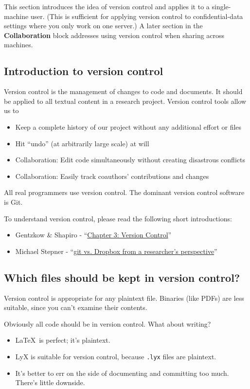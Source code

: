 This section introduces the idea of version control and applies it to a single-machine user.
(This is sufficient for applying version control to confidential-data settings where you only work on one server.)
A later section in the \textbf{Collaboration} block addresses using version control when sharing across machines.

\subsection{Introduction to version control}

Version control is the management of changes to code and documents.
It should be applied to all textual content in a research project.
Version control tools allow us to
\begin{itemize}
	\item Keep a complete history of our project without any additional effort or files
	\item Hit ``undo'' (at arbitrarily large scale) at will
	\item Collaboration: Edit code simultaneously without creating disastrous conflicts
	\item Collaboration: Easily track coauthors' contributions and changes
\end{itemize}
All real programmers use version control. The dominant version control software is Git.

To understand version control, please read the following short introductions:
\begin{itemize}
	\item Gentzkow \& Shapiro - ``\href{https://web.stanford.edu/~gentzkow/research/CodeAndData.pdf}{Chapter 3: Version Control}''
	\item Michael Stepner - ``\href{https://michaelstepner.com/blog/git-vs-dropbox}{git vs. Dropbox from a researcher's perspective}''
\end{itemize}

\subsection{Which files should be kept in version control?}

Version control is appropriate for any plaintext file.
Binaries (like PDFs) are less suitable, since you can't examine their contents.

Obviously all code should be in version control. What about writing?
\begin{itemize}
	\item \LaTeX\ is perfect; it's plaintext.
	\item LyX is suitable for version control, because \texttt{.lyx} files are plaintext.
	\item It's better to err on the side of documenting and committing too much. There's little downside.
\end{itemize}

